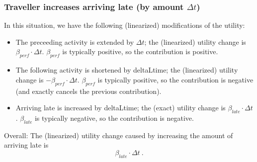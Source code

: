 \subsubsection{Traveller increases arriving late (by amount $\Delta t$)}

In this situation, we have the following (linearized) modifications of the utility:
\begin{itemize}

\item The preceeding activity is extended by $\Delta t$; the
(linearized) utility change is $\beta_{perf} \cdot \Delta
t$. $\beta_{perf}$ is typically positive, so the contribution is
positive.

\item The following activity is shortened by deltaLtime; the (linearized)  utility change is $- \beta_{perf} \cdot \Delta t$. $\beta_{perf}$ is  typically positive, so the contribution is negative (and exactly cancels  the previous contribution).

\item Arriving late is increased by deltaLtime; the (exact) utility change  is $\beta_{late} \cdot \Delta t$. $\beta_{late}$ is typically negative, so  the contribution is negative.

\end{itemize}

Overall: The (linearized) utility change caused by increasing the amount of arriving late is
\[
\beta_{late} \cdot \Delta t \ .
\]



